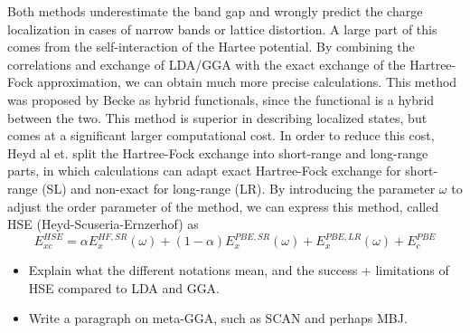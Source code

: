 Both methods underestimate the band gap and wrongly predict the charge localization in cases of narrow bands or lattice distortion. A large part of this comes from the self-interaction of the Hartee potential. By combining the correlations and exchange of LDA/GGA with the exact exchange of the Hartree-Fock approximation, we can obtain much more precise calculations. This method was proposed by Becke as hybrid functionals, since the functional is a hybrid between the two. This method is superior in describing localized states, but comes at a significant larger computational cost. In order to reduce this cost, Heyd al et. split the Hartree-Fock exchange into short-range and long-range parts, in which calculations can adapt exact Hartree-Fock exchange for short-range (SL) and non-exact for long-range (LR). By introducing the parameter $\omega$ to adjust the order parameter of the method, we can express this method, called HSE (Heyd-Scuseria-Ernzerhof) as
\begin{equation}
    E_{xc}^{HSE} = \alpha E_{x}^{HF,SR}(\omega) + (1-\alpha)E_{x}^{PBE, SR}(\omega) + E_x^{PBE,LR}(\omega) + E_{c}^{PBE}
\end{equation}
\begin{itemize}
    \item Explain what the different notations mean, and the success + limitations of HSE compared to LDA and GGA.
    \item Write a paragraph on meta-GGA, such as SCAN and perhaps MBJ.
\end{itemize}

